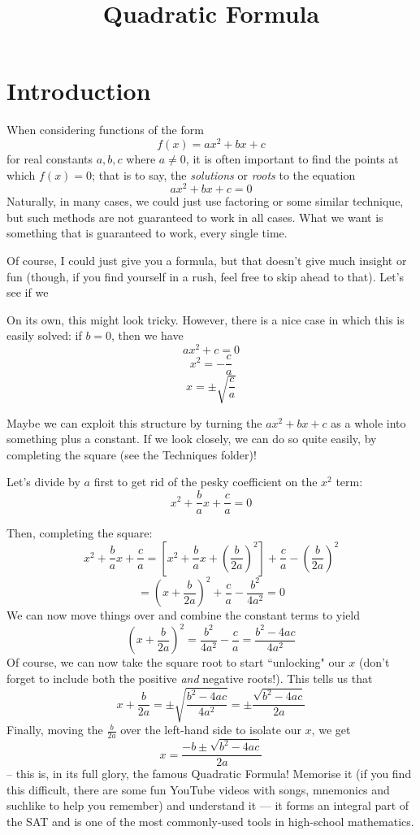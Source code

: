 \documentclass{article}
\title{Quadratic Formula}
\begin{document}
	\maketitle
	\tableofcontents
	
	\Large
	
	\newpage
	\section*{Introduction}
	When considering functions of the form
	\[f(x) = ax^2+bx+c\]
	for real constants $a, b, c$ where $a \neq 0$, it is often important to find the points at which $f(x)=0$; that is to say, the \textit{solutions} or \textit{roots} to the equation
	\[ax^2+bx+c=0\]
	Naturally, in many cases, we could just use factoring or some similar technique, but such methods are not guaranteed to work in all cases. What we want is something that is guaranteed to work, every single time.
	
	Of course, I could just give you a formula, but that doesn't give much insight or fun (though, if you find yourself in a rush, feel free to skip ahead to that). Let's see if we 
	
	On its own, this might look tricky. However, there is a nice case in which this is easily solved: if $b=0$, then we have
	\[ax^2+c=0\]
	\[x^2 = -\frac{c}{a}\]
	\[x=\pm \sqrt{\frac{c}{a}}\]
	
	Maybe we can exploit this structure by turning the $ax^2+bx+c$ as a whole into something plus a constant. If we look closely, we can do so quite easily, by completing the square (see the Techniques folder)!
	
	Let's divide by $a$ first to get rid of the pesky coefficient on the $x^2$ term:
	\[x^2+\frac{b}{a}x+\frac{c}{a}=0\]
	
	Then, completing the square:
	\[x^2+\frac{b}{a}x+\frac{c}{a} = \left[x^2 + \frac{b}{a}x + \left(\frac{b}{2a}\right)^2\right] + \frac{c}{a} - \left( \frac{b}{2a} \right)^2\]
	\[= \left( x+\frac{b}{2a} \right)^2 + \frac{c}{a} - \frac{b^2}{4a^2} = 0\]
	We can now move things over and combine the constant terms to yield
	\[\left( x + \frac{b}{2a} \right)^2 = \frac{b^2}{4a^2}-\frac{c}{a} = \frac{b^2-4ac}{4a^2}\]
	Of course, we can now take the square root to start ``unlocking" our $x$ (don't forget to include both the positive \textit{and} negative roots!). This tells us that
	\[x+\frac{b}{2a} = \pm \sqrt{\frac{b^2-4ac}{4a^2}} = \pm \frac{\sqrt{b^2-4ac}}{2a}\]
	Finally, moving the $\frac{b}{2a}$ over the left-hand side to isolate our $x$, we get
	\[x = \frac{-b \pm \sqrt{b^2-4ac}}{2a}\]
	-- this is, in its full glory, the famous Quadratic Formula! Memorise it (if you find this difficult, there are some fun YouTube videos with songs, mnemonics and suchlike to help you remember) and understand it --- it forms an integral part of the SAT and is one of the most commonly-used tools in high-school mathematics.
	
\end{document}
